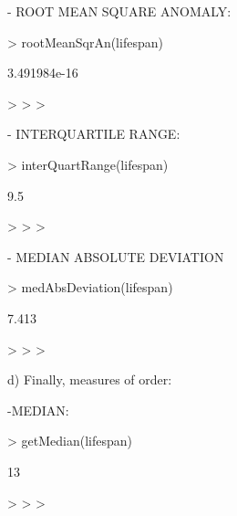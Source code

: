 \documentclass[a4paper]{article}
\begin{document}
- ROOT MEAN SQUARE ANOMALY:



\begin{Schunk}
\begin{Sinput}
> rootMeanSqrAn(lifespan)
\end{Sinput}
\begin{Soutput}
[1] 3.491984e-16
\end{Soutput}
\begin{Sinput}
> 
> 
> 
\end{Sinput}
\end{Schunk}



- INTERQUARTILE RANGE:



\begin{Schunk}
\begin{Sinput}
> interQuartRange(lifespan)
\end{Sinput}
\begin{Soutput}
[1] 9.5
\end{Soutput}
\begin{Sinput}
> 
> 
> 
\end{Sinput}
\end{Schunk}



- MEDIAN ABSOLUTE DEVIATION



\begin{Schunk}
\begin{Sinput}
> medAbsDeviation(lifespan)
\end{Sinput}
\begin{Soutput}
[1] 7.413
\end{Soutput}
\begin{Sinput}
> 
> 
> 
\end{Sinput}
\end{Schunk}



d) Finally, measures of order:







-MEDIAN:



\begin{Schunk}
\begin{Sinput}
> getMedian(lifespan)
\end{Sinput}
\begin{Soutput}
[1] 13
\end{Soutput}
\begin{Sinput}
> 
> 
> 
\end{Sinput}
\end{Schunk}
\end{document}
